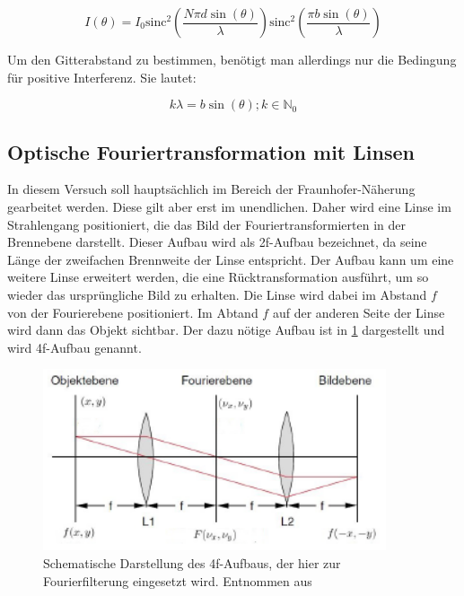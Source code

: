 \begin{equation}
I(\theta) = I_0 \text{sinc}^2\left( \frac{N\pi d \sin(\theta)}{\lambda}\right)  \text{sinc}^2\left( \frac{\pi b \sin(\theta)}{\lambda}\right) 
\label{eq:beugung}
\end{equation}

Um den Gitterabstand zu bestimmen, benötigt man allerdings nur die Bedingung für positive Interferenz. Sie lautet:

\begin{equation}
	k \lambda = b \sin(\theta); k\in \mathbb{N}_0
\end{equation}

\subsection{Optische Fouriertransformation mit Linsen}
In diesem Versuch soll hauptsächlich im Bereich der Fraunhofer-Näherung gearbeitet werden. Diese gilt aber erst im unendlichen. Daher wird eine Linse im Strahlengang positioniert, die das Bild der Fouriertransformierten in der Brennebene darstellt. Dieser Aufbau wird als 2f-Aufbau bezeichnet, da seine Länge der zweifachen Brennweite der Linse entspricht. Der Aufbau kann um eine weitere Linse erweitert werden, die eine Rücktransformation ausführt, um so wieder das ursprüngliche Bild zu erhalten. Die Linse wird dabei im Abstand $f$ von der Fourierebene positioniert. Im Abtand $f$ auf der anderen Seite der Linse wird dann das Objekt sichtbar. Der dazu nötige Aufbau ist in \cref{4f} dargestellt und wird 4f-Aufbau genannt.

\begin{figure}[h!]
	\centering
	\includegraphics[width=0.9\textwidth]{4f.PNG}
	\caption{Schematische Darstellung des 4f-Aufbaus, der hier zur Fourierfilterung eingesetzt wird. Entnommen aus \autocite{anleitung-ws2014}}
	\label{4f}
\end{figure}

